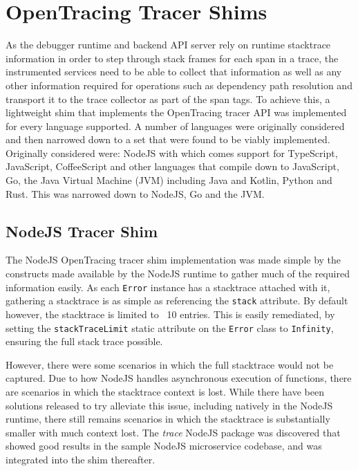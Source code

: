 \documentclass[12pt,pdftex,titlepage]{report}
\begin{document}

        \section{OpenTracing Tracer Shims}
            As the debugger runtime and backend API server rely on runtime stacktrace information in order to step through stack frames for each span in a trace, the instrumented services need to be able
            to collect that information as well as any other information required for operations such as dependency path resolution and transport it to the trace collector as part of the span tags.
            To achieve this, a lightweight shim that implements the OpenTracing tracer API was implemented for every language supported. A number of languages were originally considered and then narrowed
            down to a set that were found to be viably implemented. Originally considered were: NodeJS with which comes support for TypeScript, JavaScript, CoffeeScript and other languages that compile
            down to JavaScript, Go, the Java Virtual Machine (JVM) including Java and Kotlin, Python and Rust. This was narrowed down to NodeJS, Go and the JVM.

            \newpage
            \subsection{NodeJS Tracer Shim}
                The NodeJS OpenTracing tracer shim implementation was made simple by the constructs made available by the NodeJS runtime to gather much of the required information easily. As each \texttt{Error} 
                instance has a stacktrace attached with it, gathering a stacktrace is as simple as referencing the \texttt{stack} attribute. By default however, the stacktrace is limited to ~10 entries. This is
                easily remediated, by setting the \texttt{stackTraceLimit} static attribute on the \texttt{Error} class to \texttt{Infinity}, ensuring the full stack trace possible.

                However, there were some scenarios in which the full stacktrace would not be captured. Due to how NodeJS handles asynchronous execution of functions\cite{asyncnostack}, there are scenarios in which
                the stacktrace context is lost. While there have been solutions released to try alleviate this issue, including natively in the NodeJS runtime\cite{asyncstack}, there still remains scenarios in which
                the stacktrace is substantially smaller with much context lost. The \textit{trace}\cite{longtrace} NodeJS package was discovered that showed good results in the sample NodeJS microservice codebase, and was
                integrated into the shim thereafter.
\end{document}
